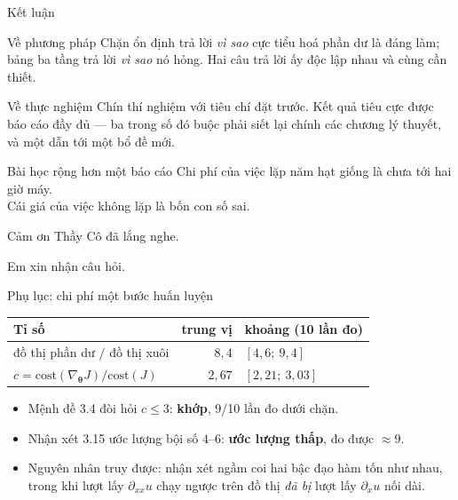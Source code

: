 \documentclass[aspectratio=169,11pt]{beamer}
\newcommand{\btheta}{\bm{\theta}}
\newcommand{\good}[1]{\textcolor{good}{\textbf{#1}}}
\newcommand{\bad}[1]{\textcolor{bad}{\textbf{#1}}}
\begin{document}
\begin{frame}{Kết luận}
\begin{block}{Về phương pháp}
Chặn ổn định trả lời \emph{vì sao} cực tiểu hoá phần dư là đáng làm;
bảng ba tầng trả lời \emph{vì sao} nó hỏng. Hai câu trả lời ấy độc lập nhau
và cùng cần thiết.
\end{block}

\begin{block}{Về thực nghiệm}
Chín thí nghiệm với tiêu chí đặt trước. Kết quả tiêu cực được báo cáo đầy đủ ---
ba trong số đó buộc phải siết lại chính các chương lý thuyết, và một dẫn tới
một bổ đề mới.
\end{block}

\begin{alertblock}{Bài học rộng hơn một báo cáo}
Chi phí của việc lặp năm hạt giống là chưa tới hai giờ máy.\\
Cái giá của việc không lặp là \alert{bốn con số sai}.
\end{alertblock}
\end{frame}

\begin{frame}[standout]
Cảm ơn Thầy Cô đã lắng nghe.

\medskip
\normalsize Em xin nhận câu hỏi.
\end{frame}

\appendix

\begin{frame}{Phụ lục: chi phí một bước huấn luyện}
\begin{table}
\small
\begin{tabular}{@{}lrl@{}}
\toprule
\textbf{Tỉ số} & \textbf{trung vị} & \textbf{khoảng} (10 lần đo) \\
\midrule
đồ thị phần dư $/$ đồ thị xuôi & $8{,}4$ & $[4{,}6;\ 9{,}4]$ \\
$c = \mathrm{cost}(\nabla_{\btheta}J)/\mathrm{cost}(J)$ & $2{,}67$ & $[2{,}21;\ 3{,}03]$ \\
\bottomrule
\end{tabular}
\end{table}

\begin{itemize}
\item Mệnh đề 3.4 đòi hỏi $c \le 3$: \good{khớp}, 9/10 lần đo dưới chặn.
\item Nhận xét 3.15 ước lượng bội số $4$--$6$: \bad{ước lượng thấp}, đo được $\approx 9$.
\item Nguyên nhân truy được: nhận xét ngầm coi hai bậc đạo hàm tốn như nhau,
  trong khi lượt lấy $\partial_{xx}u$ chạy ngược trên đồ thị \emph{đã bị}
  lượt lấy $\partial_x u$ nối dài.
\end{itemize}
\end{frame}
\end{document}
